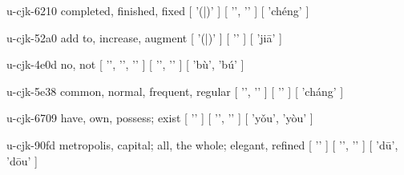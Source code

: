 \begin{multicols}{2}
\cjkgGlue{} u-cjk-6210  completed, finished, fixed  [ '\cjkgGlue{}(\cjkgGlue{}|\cjkgGlue{})' ]  [ '\cjkgGlue{}', '\cjkgGlue{}' ]  [ 'chéng' ] 

\cjkgGlue{} u-cjk-52a0  add to, increase, augment  [ '\cjkgGlue{}(\cjkgGlue{}|\cjkgGlue{})' ]  [ '\cjkgGlue{}' ]  [ 'ji{\mktsRsgFb{}ā}' ] 

\cjkgGlue{} u-cjk-4e0d  no, not  [ '\cjkgGlue{}', '\cjkgGlue{}', '\cjkgGlue{}' ]  [ '\cjkgGlue{}', '\cjkgGlue{}' ]  [ 'bù', 'bú' ] 

\cjkgGlue{} u-cjk-5e38  common, normal, frequent, regular  [ '\cjkgGlue{}', '\cjkgGlue{}' ]  [ '\cjkgGlue{}' ]  [ 'cháng' ] 

\cjkgGlue{} u-cjk-6709  have, own, possess; exist  [ '\cjkgGlue{}' ]  [ '\cjkgGlue{}', '\cjkgGlue{}' ]  [ 'y{\mktsRsgFb{}ǒ}u', 'yòu' ] 

\cjkgGlue{} u-cjk-90fd  metropolis, capital; all, the whole; elegant, refined  [ '\cjkgGlue{}' ]  [ '\cjkgGlue{}', '\cjkgGlue{}' ]  [ 'd{\mktsRsgFb{}ū}', 'd{\mktsRsgFb{}ō}u' ] 


\end{multicols}
